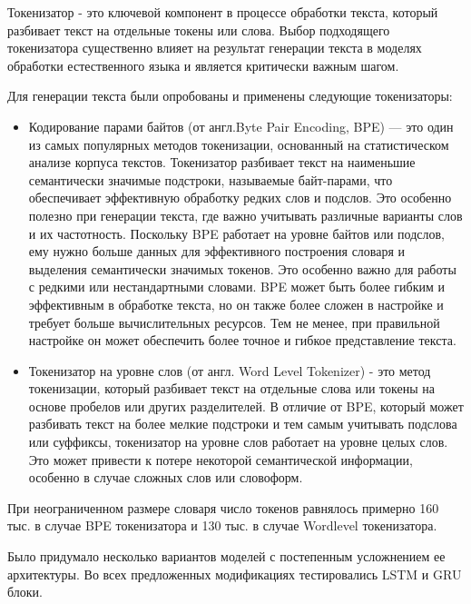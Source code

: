 \documentclass[a4paper,12pt]{extarticle}
\begin{document}
Токенизатор - это ключевой компонент в процессе обработки текста, который разбивает текст на отдельные токены или слова. Выбор подходящего токенизатора существенно влияет на результат генерации текста в моделях обработки естественного языка и является критически важным шагом.

Для генерации текста были опробованы и применены следующие токенизаторы:
\begin{itemize}
	\item Кодирование парами байтов (от англ.Byte Pair Encoding, BPE) — это один из самых популярных методов токенизации, основанный на статистическом анализе корпуса текстов. Токенизатор разбивает текст на наименьшие семантически значимые подстроки, называемые байт-парами, что обеспечивает эффективную обработку редких слов и подслов. Это особенно полезно при генерации текста, где важно учитывать различные варианты слов и их частотность. Поскольку BPE работает на уровне байтов или подслов, ему нужно больше данных для эффективного построения словаря и выделения семантически значимых токенов. Это особенно важно для работы с редкими или нестандартными словами. BPE может быть более гибким и эффективным в обработке текста, но он также более сложен в настройке и требует больше вычислительных ресурсов. Тем не менее, при правильной настройке он может обеспечить более точное и гибкое представление текста.
	\item Токенизатор на уровне слов (от англ. Word Level Tokenizer) - это метод токенизации, который разбивает текст на отдельные слова или токены на основе пробелов или других разделителей. В отличие от BPE, который может разбивать текст на более мелкие подстроки и тем самым учитывать подслова или суффиксы, токенизатор на уровне слов работает на уровне целых слов. Это может привести к потере некоторой семантической информации, особенно в случае сложных слов или словоформ.
\end{itemize}
При неограниченном размере словаря число токенов равнялось примерно 160 тыс. в случае BPE токенизатора и 130 тыс. в случае Wordlevel токенизатора.

Было придумало несколько вариантов моделей с постепенным усложнением ее архитектуры. Во всех предложенных модификациях тестировались LSTM и GRU блоки.
\end{document}

